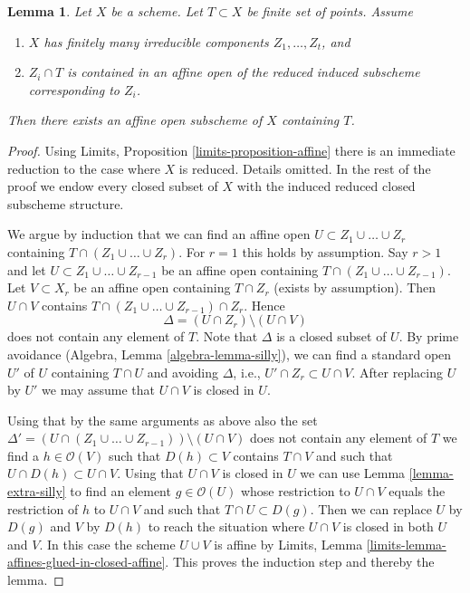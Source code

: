 \documentclass[10pt,a4paper]{amsart}
\theoremstyle{plain}
\newtheorem{lemma}[subsection]{Lemma}
\theoremstyle{definition}
\theoremstyle{remark}
\numberwithin{equation}{subsection}
\begin{document}
\begin{lemma}
\label{lemma-finite-set-codim-1-points-in-affine-per-component}
Let $X$ be a scheme. Let $T \subset X$ be finite set of points. Assume
\begin{enumerate}
\item $X$ has finitely many irreducible components $Z_1, \ldots, Z_t$, and
\item $Z_i \cap T$ is contained in an affine open of the reduced
induced subscheme corresponding to $Z_i$.
\end{enumerate}
Then there exists an affine open subscheme of $X$ containing $T$.
\end{lemma}

\begin{proof}
Using Limits, Proposition \ref{limits-proposition-affine}
there is an immediate reduction to the case where $X$
is reduced. Details omitted. In the rest of the proof we
endow every closed subset of $X$ with the induced reduced closed
subscheme structure.

\medskip\noindent
We argue by induction that we can find an affine open
$U \subset Z_1 \cup \ldots \cup Z_r$ containing
$T \cap (Z_1 \cup \ldots \cup Z_r)$. For $r = 1$ this holds by assumption.
Say $r > 1$ and let $U \subset Z_1 \cup \ldots \cup Z_{r -  1}$
be an affine open containing $T \cap (Z_1 \cup \ldots \cup Z_{r - 1})$.
Let $V \subset X_r$ be an affine open containing $T \cap Z_r$ (exists by
assumption). Then $U \cap V$ contains
$T \cap ( Z_1 \cup \ldots \cup Z_{r - 1} ) \cap Z_r$.
Hence
$$
\Delta = (U \cap Z_r) \setminus (U \cap V)
$$
does not contain any element of $T$. Note that $\Delta$ is a closed
subset of $U$. By prime avoidance (Algebra, Lemma \ref{algebra-lemma-silly}),
we can find a standard open $U'$ of $U$ containing $T \cap U$ and avoiding
$\Delta$, i.e., $U' \cap Z_r \subset U \cap V$.
After replacing $U$ by $U'$ we may assume that $U \cap V$ is
closed in $U$.

\medskip\noindent
Using that by the same arguments as above also the set
$\Delta' = (U \cap (Z_1 \cup \ldots \cup Z_{r - 1})) \setminus (U \cap V)$
does not contain any element of $T$ we find a $h \in \mathcal{O}(V)$
such that $D(h) \subset V$ contains $T \cap V$ and such that
$U \cap D(h) \subset U \cap V$. Using that $U \cap V$ is closed in $U$
we can use Lemma \ref{lemma-extra-silly}
to find an element $g \in \mathcal{O}(U)$ whose restriction to $U \cap V$
equals the restriction of $h$ to $U \cap V$ and such that
$T \cap U \subset D(g)$. Then we can replace $U$ by $D(g)$
and $V$ by $D(h)$ to reach the situation where $U \cap V$ is
closed in both $U$ and $V$. In this case the scheme $U \cup V$ is
affine by Limits, Lemma \ref{limits-lemma-affines-glued-in-closed-affine}.
This proves the induction step and thereby the lemma.
\end{proof}
\end{document}
